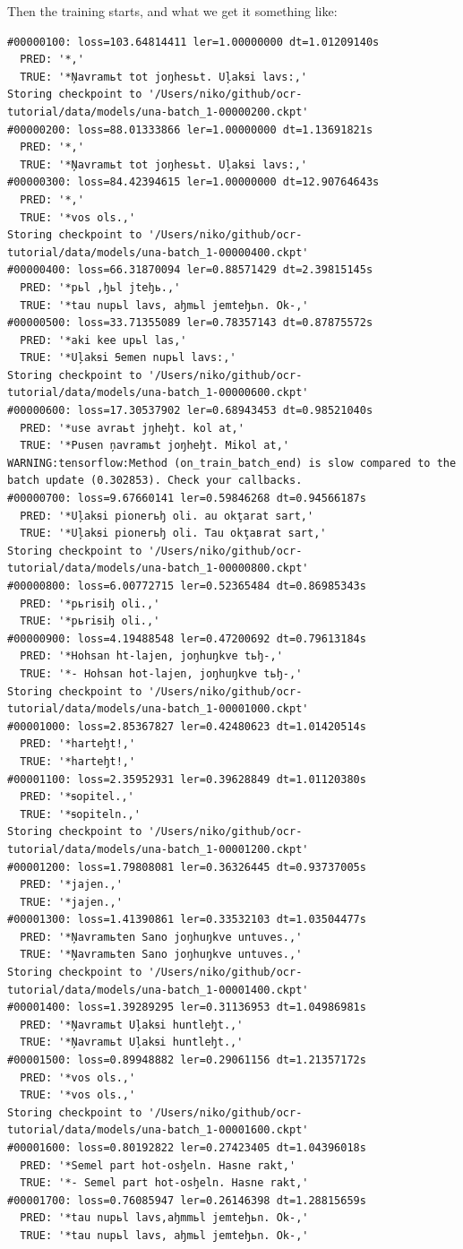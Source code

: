 \documentclass[]{book}
\begin{document}
Then the training starts, and what we get it something like:

\begin{verbatim}
#00000100: loss=103.64814411 ler=1.00000000 dt=1.01209140s
  PRED: '*,'
  TRUE: '*Ņavramьt tot joŋhesьt. Uļakꞩi lavs:,'
Storing checkpoint to '/Users/niko/github/ocr-tutorial/data/models/una-batch_1-00000200.ckpt'
#00000200: loss=88.01333866 ler=1.00000000 dt=1.13691821s
  PRED: '*,'
  TRUE: '*Ņavramьt tot joŋhesьt. Uļakꞩi lavs:,'
#00000300: loss=84.42394615 ler=1.00000000 dt=12.90764643s
  PRED: '*,'
  TRUE: '*vos ols.,'
Storing checkpoint to '/Users/niko/github/ocr-tutorial/data/models/una-batch_1-00000400.ckpt'
#00000400: loss=66.31870094 ler=0.88571429 dt=2.39815145s
  PRED: '*pьl ,ꜧьl jteꜧь.,'
  TRUE: '*tau nupьl lavs, aꜧmьl jemteꜧьn. Ok-,'
#00000500: loss=33.71355089 ler=0.78357143 dt=0.87875572s
  PRED: '*aki kee upьl las,'
  TRUE: '*Uļakꞩi Ꞩemen nupьl lavs:,'
Storing checkpoint to '/Users/niko/github/ocr-tutorial/data/models/una-batch_1-00000600.ckpt'
#00000600: loss=17.30537902 ler=0.68943453 dt=0.98521040s
  PRED: '*use avraьt jŋheꜧt. kol at,'
  TRUE: '*Pusen ņavramьt joŋheꜧt. Mikol at,'
WARNING:tensorflow:Method (on_train_batch_end) is slow compared to the batch update (0.302853). Check your callbacks.
#00000700: loss=9.67660141 ler=0.59846268 dt=0.94566187s
  PRED: '*Uļakꞩi pionerьꜧ oli. au okţarat sart,'
  TRUE: '*Uļakꞩi pionerьꜧ oli. Tau okţaвrat sart,'
Storing checkpoint to '/Users/niko/github/ocr-tutorial/data/models/una-batch_1-00000800.ckpt'
#00000800: loss=6.00772715 ler=0.52365484 dt=0.86985343s
  PRED: '*pьriꞩiꜧ oli.,'
  TRUE: '*pьriꞩiꜧ oli.,'
#00000900: loss=4.19488548 ler=0.47200692 dt=0.79613184s
  PRED: '*Hohsan ht-lajen, joŋhuŋkve tьꜧ-,'
  TRUE: '*- Hohsan hot-lajen, joŋhuŋkve tьꜧ-,'
Storing checkpoint to '/Users/niko/github/ocr-tutorial/data/models/una-batch_1-00001000.ckpt'
#00001000: loss=2.85367827 ler=0.42480623 dt=1.01420514s
  PRED: '*harteꜧt!,'
  TRUE: '*harteꜧt!,'
#00001100: loss=2.35952931 ler=0.39628849 dt=1.01120380s
  PRED: '*ꞩopitel.,'
  TRUE: '*ꞩopiteln.,'
Storing checkpoint to '/Users/niko/github/ocr-tutorial/data/models/una-batch_1-00001200.ckpt'
#00001200: loss=1.79808081 ler=0.36326445 dt=0.93737005s
  PRED: '*jajen.,'
  TRUE: '*jajen.,'
#00001300: loss=1.41390861 ler=0.33532103 dt=1.03504477s
  PRED: '*Ņavramьten Sano joŋhuŋkve untuves.,'
  TRUE: '*Ņavramьten Sano joŋhuŋkve untuves.,'
Storing checkpoint to '/Users/niko/github/ocr-tutorial/data/models/una-batch_1-00001400.ckpt'
#00001400: loss=1.39289295 ler=0.31136953 dt=1.04986981s
  PRED: '*Ņavramьt Uļakꞩi huntleꜧt.,'
  TRUE: '*Ņavramьt Uļakꞩi huntleꜧt.,'
#00001500: loss=0.89948882 ler=0.29061156 dt=1.21357172s
  PRED: '*vos ols.,'
  TRUE: '*vos ols.,'
Storing checkpoint to '/Users/niko/github/ocr-tutorial/data/models/una-batch_1-00001600.ckpt'
#00001600: loss=0.80192822 ler=0.27423405 dt=1.04396018s
  PRED: '*Semel part hot-osꜧeln. Hasne rakt,'
  TRUE: '*- Semel part hot-osꜧeln. Hasne rakt,'
#00001700: loss=0.76085947 ler=0.26146398 dt=1.28815659s
  PRED: '*tau nupьl lavs,aꜧmmьl jemteꜧьn. Ok-,'
  TRUE: '*tau nupьl lavs, aꜧmьl jemteꜧьn. Ok-,'
\end{verbatim}
\end{document}
